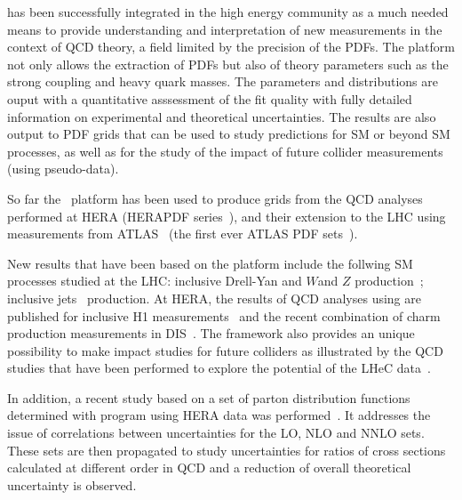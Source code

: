 \fitter has been successfully integrated in the high energy community as a much needed means to provide understanding and interpretation of new measurements in the context of QCD theory, a field limited by the precision of the PDFs.  
The \fitter platform not only allows the extraction of PDFs but also of theory parameters such as the strong coupling and heavy quark masses. The parameters and distributions are ouput with a
quantitative asssessment of the fit quality with fully detailed information on 
experimental and theoretical uncertainties.
The results are also output to PDF grids that can be used to study predictions for SM or beyond SM processes, as well as for the study of the impact of 
future collider measurements (using pseudo-data).


So far the \fitter\ platform has been used to produce grids 
from the QCD analyses performed at 
HERA (HERAPDF series~\cite{h1zeus:2009wt}), and their extension to the LHC 
using 
measurements from ATLAS~\cite{atlas:strange,atlas:jets} (the first ever ATLAS PDF sets~\cite{atlas:grids}).

New results that have been based on the \fitter platform include 
the follwing SM processes 
studied at the LHC:  inclusive Drell-Yan and $W$and $Z$ 
production~\cite{atlas:strange,atlas:hm,cms:strange};
inclusive jets~\cite{atlas:jets,cms:jets} production.
At HERA, the results of QCD analyses using \fitter are 
published for inclusive H1 measurements~\cite{h1:2012kk}
and the recent combination of charm production measurements 
in DIS~\cite{h1zeus:charm}.
The \fitter framework also provides an unique possibility to 
make impact studies for future colliders
as illustrated by the QCD studies that have been performed to 
explore the potential of the LHeC data~\cite{lhec:studies}.

In addition, a recent study based on a set of parton distribution functions 
determined with \fitter  program using HERA data was performed~\cite{hfcorrpaper}.
It addresses the issue of correlations between uncertainties for the LO,
NLO and NNLO sets. These sets are then propagated to study uncertainties 
for ratios of cross sections calculated at different order in QCD and  
a reduction of overall theoretical uncertainty is observed.

